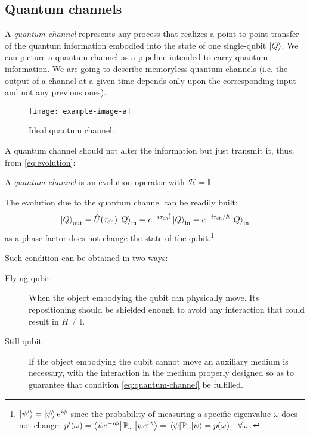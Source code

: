 \subsection{Quantum channels}
A \emph{quantum channel} represents any process that realizes a point-to-point transfer of the quantum information embodied into the state of one single-qubit $\ket{Q}$. We can picture a quantum channel as a pipeline intended to carry quantum information. We are going to describe memoryless quantum channels (i.e. the output of a channel at a given time depends only upon the corresponding input and not any previous ones).
\begin{figure}[htb]
\centering
\texttt{[image: example-image-a]}
\caption{Ideal quantum channel.}
\label{fig:quantum-channel}
\end{figure}
A quantum channel should not alter the information but just transmit it, thus, from \eqref{eq:evolution}:
\begin{defn}
A \emph{quantum channel} is an evolution operator with $\mathcal{H}=\mathbb{I}$
\end{defn}
The evolution due to the quantum channel can be readily built:
\begin{equation}\label{eq:quantum-channel}
    \ket{Q}_\textup{out} = \hat{U}(\tau_\textup{ch}) \ket{Q}_\textup{in} = e^{-i\tau_\textup{ch}\hat{\mathbb{I}}} \ket{Q}_\textup{in} = e^{-i\tau_\textup{ch}/\hbar} \ket{Q}_\textup{in}
\end{equation}
as a phase factor does not change the state of the qubit.\footnote{$\ket{\psi'}= \ket{\psi}e^{i\phi}$ since the probability of measuring a specific eigenvalue $\omega$ does not change: $p'(\omega) = \bra{\psi e^{-i\phi}}\mathbb{P}_\omega\ket{\psi e^{i\phi}} = \expval{\mathbb{P}_\omega}{\psi} = p(\omega) \quad \forall \omega\,.$}

Such condition can be obtained in two ways:
\begin{description}
\item[Flying qubit] When the object embodying the qubit can physically move. Its repositioning should be shielded enough to avoid any interaction that could result in $H \neq \mathbb{I}$.
\item[Still qubit] If the object embodying the qubit cannot move an auxiliary medium is necessary, with the interaction in the medium properly designed so as to guarantee that condition \eqref{eq:quantum-channel} be fulfilled.
\end{description}

